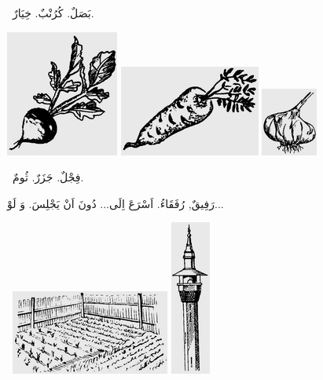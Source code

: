\documentclass[a5paper]{article}
\begin{document}
\ بَصَلٌ. كُرُنْبٌ. خِيَارٌ. 

 \includegraphics[width=1.4583in,height=1.6354in]{images/MuhammadBagauddinprettified-img242.png}  \includegraphics[width=1.8228in,height=1.1772in]{images/MuhammadBagauddinprettified-img243.png}   \includegraphics[width=0.7291in,height=0.8854in]{images/MuhammadBagauddinprettified-img244.png} 

\ فِجْلٌ. جَزَرٌ. ثُومٌ.

رَفِيقٌ, رُفَقَاءُ. اَسْرَعَ اِلَى... دُونَ اَنْ يَجْلِسَ. وَ لَوْ... 

\  \includegraphics[width=2.052in,height=1.0937in]{images/MuhammadBagauddinprettified-img245.png}   \includegraphics[width=0.5102in,height=2.0102in]{images/MuhammadBagauddinprettified-img246.png} 
\end{document}
